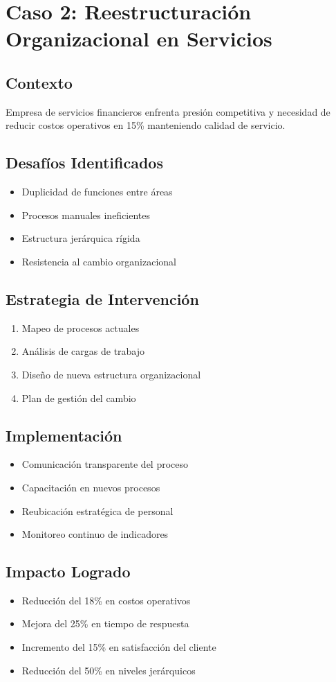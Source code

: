 \documentclass[12pt,letterpaper,oneside]{book}
\begin{document}
\section{Caso 2: Reestructuración Organizacional en Servicios}

\subsection{Contexto}

Empresa de servicios financieros enfrenta presión competitiva y necesidad de reducir costos operativos en 15\% manteniendo calidad de servicio.

\subsection{Desafíos Identificados}

\begin{itemize}
\item Duplicidad de funciones entre áreas
\item Procesos manuales ineficientes
\item Estructura jerárquica rígida
\item Resistencia al cambio organizacional
\end{itemize}

\subsection{Estrategia de Intervención}

\begin{enumerate}
\item Mapeo de procesos actuales
\item Análisis de cargas de trabajo
\item Diseño de nueva estructura organizacional
\item Plan de gestión del cambio
\end{enumerate}

\subsection{Implementación}

\begin{itemize}
\item Comunicación transparente del proceso
\item Capacitación en nuevos procesos
\item Reubicación estratégica de personal
\item Monitoreo continuo de indicadores
\end{itemize}

\subsection{Impacto Logrado}

\begin{itemize}
\item Reducción del 18\% en costos operativos
\item Mejora del 25\% en tiempo de respuesta
\item Incremento del 15\% en satisfacción del cliente
\item Reducción del 50\% en niveles jerárquicos
\end{itemize}
\end{document}
